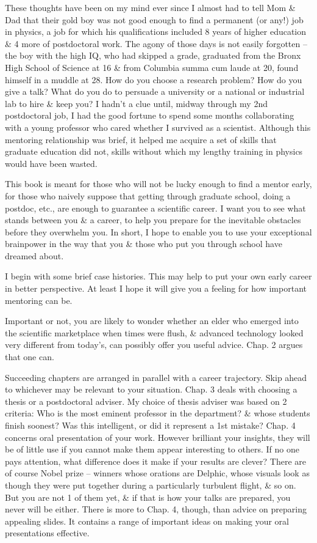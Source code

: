 \documentclass{article}
\begin{document}
\begin{enumerate}
\begin{itemize}
		These thoughts have been on my mind ever since I almost had to tell Mom \& Dad that their gold boy was not good enough to find a permanent (or any!) job in physics, a job for which his qualifications included 8 years of higher education \& 4 more of postdoctoral work. The agony of those days is not easily forgotten -- the boy with the high IQ, who had skipped a grade, graduated from the Bronx High School of Science at 16 \& from Columbia summa cum laude at 20, found himself in a muddle at 28. How do you choose a research problem? How do you give a talk? What do you do to persuade a university or a national or industrial lab to hire \& keep you? I hadn't a clue until, midway through my 2nd postdoctoral job, I had the good fortune to spend some months collaborating with a young professor who cared whether I survived as a scientist. Although this mentoring relationship was brief, it helped me acquire a set of skills that graduate education did not, skills without which my lengthy training in physics would have been wasted.
		
		This book is meant for those who will not be lucky enough to find a mentor early, for those who naively suppose that getting through graduate school, doing a postdoc, etc., are enough to guarantee a scientific career. I want you to see what stands between you \& a career, to help you prepare for the inevitable obstacles before they overwhelm you. In short, I hope to enable you to use your exceptional brainpower in the way that you \& those who put you through school have dreamed about.
		
		I begin with some brief case histories. This may help to put your own early career in better perspective. At least I hope it will give you a feeling for how important mentoring can be.
		
		Important or not, you are likely to wonder whether an elder who emerged into the scientific marketplace when times were flush, \& advanced technology looked very different from today's, can possibly offer you useful advice. Chap. 2 argues that one can.
		
		Succeeding chapters are arranged in parallel with a career trajectory. Skip ahead to whichever may be relevant to your situation. Chap. 3 deals with choosing a thesis or a postdoctoral adviser. My choice of thesis adviser was based on 2 criteria: Who is the most eminent professor in the department? \& whose students finish soonest? Was this intelligent, or did it represent a 1st mistake? Chap. 4 concerns oral presentation of your work. However brilliant your insights, they will be of little use if you cannot make them appear interesting to others. If no one pays attention, what difference does it make if your results are clever? There are of course Nobel prize -- winners whose orations are Delphic, whose visuals look as though they were put together during a particularly turbulent flight, \& so on. But you are not 1 of them yet, \& if that is how your talks are prepared, you never will be either. There is more to Chap. 4, though, than advice on preparing appealing slides. It contains a range of important ideas on making your oral presentations effective.
		

\end{itemize}
\end{enumerate}
\end{document}
